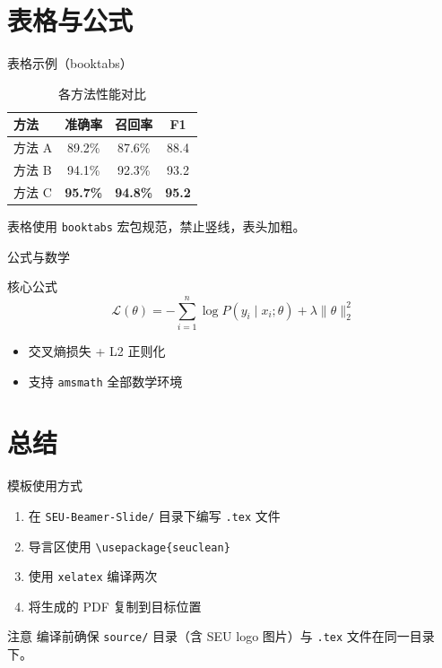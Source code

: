 \documentclass[aspectratio=169, 11pt]{beamer}
\begin{document}
\section{表格与公式}

\begin{frame}{表格示例（booktabs）}
\begin{table}
\centering
\caption{各方法性能对比}
\begin{tabular}{lccc}
\toprule
\textbf{方法} & \textbf{准确率} & \textbf{召回率} & \textbf{F1} \\
\midrule
方法 A & 89.2\% & 87.6\% & 88.4 \\
方法 B & 94.1\% & 92.3\% & 93.2 \\
方法 C & \textbf{95.7\%} & \textbf{94.8\%} & \textbf{95.2} \\
\bottomrule
\end{tabular}
\end{table}

\vspace{0.2cm}

\footnotesize 表格使用 \texttt{booktabs} 宏包规范，禁止竖线，表头加粗。
\end{frame}

\begin{frame}{公式与数学}
\begin{block}{核心公式}
  \begin{equation}
    \mathcal{L}(\theta) = -\sum_{i=1}^{n} \log P(y_i \mid x_i; \theta) + \lambda \|\theta\|_2^2
  \end{equation}
\end{block}

\vspace{0.2cm}

\begin{itemize}
  \item 交叉熵损失 + L2 正则化
  \item 支持 \texttt{amsmath} 全部数学环境
\end{itemize}
\end{frame}

\section{总结}

\begin{frame}{模板使用方式}
\begin{enumerate}
  \item 在 \texttt{SEU-Beamer-Slide/} 目录下编写 \texttt{.tex} 文件
  \item 导言区使用 \texttt{\textbackslash usepackage\{seu\textunderscore clean\}}
  \item 使用 \texttt{xelatex} 编译两次
  \item 将生成的 PDF 复制到目标位置
\end{enumerate}

\vspace{0.3cm}

\begin{alertblock}{注意}
  编译前确保 \texttt{source/} 目录（含 SEU logo 图片）与 \texttt{.tex} 文件在同一目录下。
\end{alertblock}
\end{frame}
\end{document}
